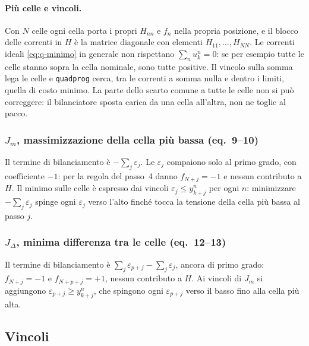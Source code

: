 \documentclass[11pt,a4paper]{article}
\begin{document}
\paragraph{Più celle e vincoli.} Con $N$ celle ogni cella porta i propri
$H_{nn}$ e $f_n$ nella propria posizione, e il blocco delle correnti in $H$ è
la matrice diagonale con elementi $H_{11}, \dots, H_{NN}$. Le correnti ideali
\eqref{eq:q-minimo} in generale non rispettano $\sum_n u^n_k = 0$: se per
esempio tutte le celle stanno sopra la cella nominale, sono tutte positive. Il
vincolo sulla somma lega le celle e \texttt{quadprog} cerca, tra le correnti a
somma nulla e dentro i limiti, quella di costo minimo. La parte dello scarto
comune a tutte le celle non si può correggere: il bilanciatore sposta carica
da una cella all'altra, non ne toglie al pacco.

\subsubsection{$J_m$, massimizzazione della cella più bassa (eq.~9--10)}

Il termine di bilanciamento è $-\sum_j \varepsilon_j$. Le $\varepsilon_j$
compaiono solo al primo grado, con coefficiente $-1$: per la regola del
passo~4 danno $f_{N+j} = -1$ e nessun contributo a $H$. Il minimo sulle celle
è espresso dai vincoli $\varepsilon_j \le y^n_{k+j}$ per ogni $n$: minimizzare
$-\sum_j \varepsilon_j$ spinge ogni $\varepsilon_j$ verso l'alto finché tocca
la tensione della cella più bassa al passo $j$.

\subsubsection{$J_\Delta$, minima differenza tra le celle (eq.~12--13)}

Il termine di bilanciamento è $\sum_j \varepsilon_{p+j} - \sum_j
\varepsilon_j$, ancora di primo grado: $f_{N+j} = -1$ e $f_{N+p+j} = +1$,
nessun contributo a $H$. Ai vincoli di $J_m$ si aggiungono
$\varepsilon_{p+j} \ge y^n_{k+j}$, che spingono ogni $\varepsilon_{p+j}$ verso
il basso fino alla cella più alta.

\subsection{Vincoli}\label{sec:vincoli}
\end{document}
